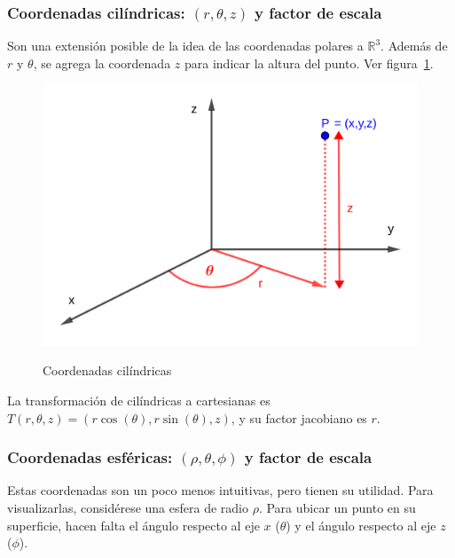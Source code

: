 \documentclass{article}
\renewcommand{\Bbb}{\mathbb}
\begin{document}
\subsubsection{Coordenadas cilíndricas: \texorpdfstring{$(r, \theta, z)$}{(r, theta, z)} y factor de escala}

Son una extensión posible de la idea de las coordenadas polares a $\Bbb R^3$. Además de $r$ y $\theta$, se agrega la coordenada $z$ para indicar la altura del punto. Ver figura~\ref{fig:ccil}.

\begin{figure}[ht]
\centering
\caption{Coordenadas cilíndricas}
\includegraphics[scale=0.8]{img/integrales/cilindricas.png}
\label{fig:ccil}
\end{figure}

La transformación de cilíndricas a cartesianas es $T(r, \theta, z) = (r \cos(\theta), r \sin(\theta), z)$, y su factor jacobiano es $r$.

\subsubsection{Coordenadas esféricas: \texorpdfstring{$(\rho, \theta, \phi)$}{rho, theta, phi} y factor de escala}

Estas coordenadas son un poco menos intuitivas, pero tienen su utilidad. Para visualizarlas, considérese una esfera de radio $\rho$. Para ubicar un punto en su superficie, hacen falta el ángulo respecto al eje $x$ ($\theta$) y el ángulo respecto al eje $z$ ($\phi$).
\end{document}
